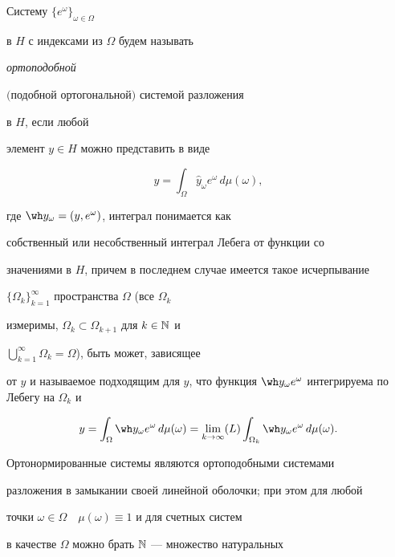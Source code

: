 \begin{defn}\hspace{-2mm}{\bf.}


Систему $\{e^\omega\}_{\omega\in\Omega}$


в $H$ с индексами из $\Omega$ будем называть {\it ортоподобной


$($подобной ортогональной$)$ системой разложения} в $H$, если любой


элемент $y\in H$ можно представить в виде


\begin{equation}


y=\int_\Omega\widehat y_\omega e^\omega\,d\mu(\omega),


\end{equation}


где $\wh y_\omega=(y,e^\omega)$, интеграл понимается как


собственный или несобственный интеграл Лебега от функции со


значениями в $H$, причем в последнем случае имеется такое исчерпывание


$\{\Omega_k\}^\infty_{k=1}$ пространства $\Omega$ (все $\Omega_k$


измеримы, $\Omega_k\subset\Omega_{k+1}$ для $k\in\Bbb N$ и


$\bigcup^\infty_{k=1}\Omega_k =\Omega$), быть может, зависящее


от $y$ и называемое подходящим для $y$, что функция $\wh


y_\omega e^\omega$ интегрируема по Лебегу на $\Omega_k$ и


\begin{equation}


y=\int_\Omega\wh y_\omega e^\omega\,d\mu(\omega)=


\lim_{k\to\infty}(L)\int_{\Omega_k}\wh y_\omega e^\omega


\,d\mu(\omega).


\end{equation}


\end{defn}





Ортонормированные системы являются ортоподобными системами


разложения в замыкании своей линейной оболочки; при этом для любой


точки $\omega\in\Omega\quad\mu(\omega)\equiv 1$ и для счетных систем


в качестве $\Omega$ можно брать $\Bbb N$ --- множество натуральных



